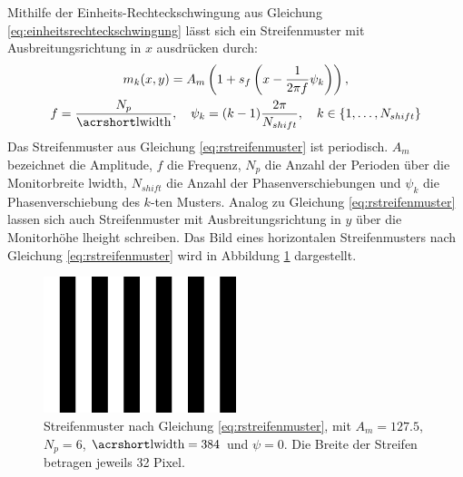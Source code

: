 \noindent
Mithilfe der Einheits-Rechteckschwingung aus Gleichung \ref{eq:einheitsrechteckschwingung} lässt sich ein Streifenmuster mit Ausbreitungsrichtung in $x$ ausdrücken durch:
\begin{equation} \label{eq:rstreifenmuster}
	\begin{gathered}
		m_k(x,y) = A_m 
		\left(
			1 + s_f \left(x - \dfrac{1}{2\pi f} \psi_k \right)
		\right),\\
		f = \dfrac{N_p}{\acrshortmath{lwidth}},
		\quad
		\psi_k = (k - 1)\dfrac{2\pi}{N_{shift}},
		\quad
		k \in \lbrace 1,\ldots,N_{shift}\rbrace 
	\end{gathered}
\end{equation}
%
Das Streifenmuster aus Gleichung \ref{eq:rstreifenmuster} ist periodisch.
$A_m$ bezeichnet die Amplitude, $f$ die Frequenz, $N_p$ die Anzahl der Perioden über die Monitorbreite \acrshort{lwidth}, $N_{shift}$ die Anzahl der Phasenverschiebungen und $\psi_k$ die Phasenverschiebung des $k$-ten Musters.
Analog zu Gleichung \ref{eq:rstreifenmuster} lassen sich auch Streifenmuster mit Ausbreitungsrichtung in $y$ über die Monitorhöhe \acrshort{lheight} schreiben.
Das Bild eines horizontalen Streifenmusters nach Gleichung \ref{eq:rstreifenmuster} wird in Abbildung \ref{img:rechteckStreifenmuster} dargestellt.
%
\begin{figure}[H]
	\centering
	\includegraphics[frame,width=0.5\textwidth]{03_sichtpruefungDurchLichtstreuung/einsatzVonMehrerenStreifenmustern/figures/rechteckStreifenmuster}
	\caption[Rechteckförmiges Streifenmuster]{Streifenmuster nach Gleichung \ref{eq:rstreifenmuster}, mit $A_m = 127.5$, $N_p = 6$, $\acrshortmath{lwidth} = 384$ und $\psi = 0$. Die Breite der Streifen betragen jeweils 32 Pixel.}
	\label{img:rechteckStreifenmuster}
\end{figure}

